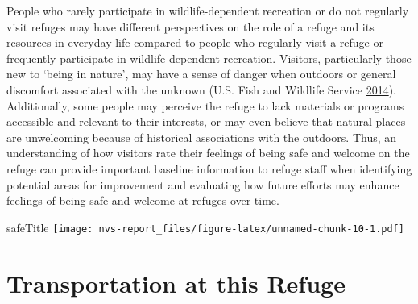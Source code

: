 \documentclass[]{book}
\let\BeginKnitrBlock\begin \let\EndKnitrBlock\end
\begin{document}
\BeginKnitrBlock{preamble1}
People who rarely participate in wildlife-dependent recreation or do not
regularly visit refuges may have different perspectives on the role of a
refuge and its resources in everyday life compared to people who
regularly visit a refuge or frequently participate in wildlife-dependent
recreation. Visitors, particularly those new to `being in nature', may
have a sense of danger when outdoors or general discomfort associated
with the unknown (U.S. Fish and Wildlife Service
\protect\hyperlink{ref-USFWS2014}{2014}). Additionally, some people may
perceive the refuge to lack materials or programs accessible and
relevant to their interests, or may even believe that natural places are
unwelcoming because of historical associations with the outdoors. Thus,
an understanding of how visitors rate their feelings of being safe and
welcome on the refuge can provide important baseline information to
refuge staff when identifying potential areas for improvement and
evaluating how future efforts may enhance feelings of being safe and
welcome at refuges over time.
\EndKnitrBlock{preamble1}

safeTitle
\texttt{[image: nvs-report\_files/figure-latex/unnamed-chunk-10-1.pdf]}

\chapter{Transportation at this Refuge}\label{trans}
\end{document}
